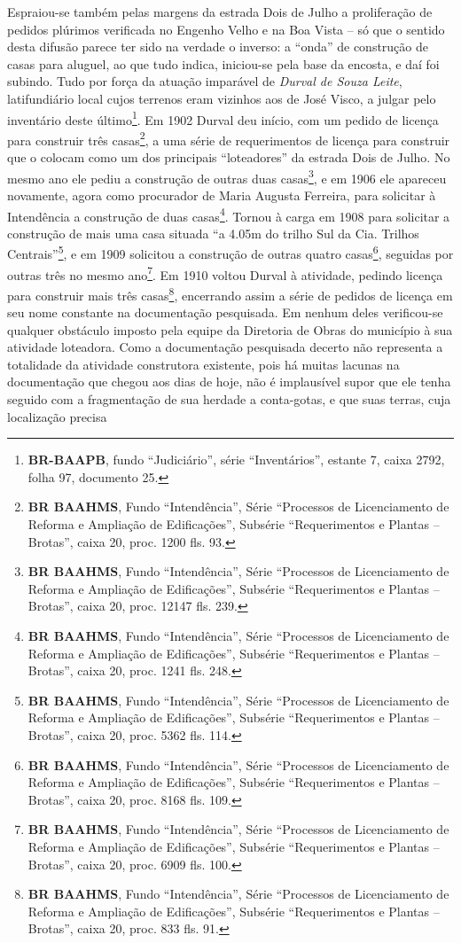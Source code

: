Espraiou-se também pelas margens da estrada Dois de Julho a proliferação de pedidos plúrimos verificada no Engenho Velho e na Boa Vista -- só que o sentido desta difusão parece ter sido na verdade o inverso: a ``onda'' de construção de casas para aluguel, ao que tudo indica, iniciou-se pela base da encosta, e daí foi subindo. Tudo por força da atuação imparável de \textit{Durval de Souza Leite}, latifundiário local cujos terrenos eram vizinhos aos de José Visco, a julgar pelo inventário deste último\footnote{\textbf{BR-BAAPB}, fundo ``Judiciário'', série ``Inventários'', estante 7, caixa 2792, folha 97, documento 25.}. Em 1902 Durval deu início, com um pedido de licença para construir três casas\footnote{\textbf{BR BAAHMS}, Fundo ``Intendência'', Série ``Processos de Licenciamento de Reforma e Ampliação de Edificações'', Subsérie ``Requerimentos e Plantas -- Brotas'', caixa 20, proc. 1200 fls. 93.}, a uma série de requerimentos de licença para construir que o colocam como um dos principais ``loteadores'' da estrada Dois de Julho. No mesmo ano ele pediu a construção de outras duas casas\footnote{\textbf{BR BAAHMS}, Fundo ``Intendência'', Série ``Processos de Licenciamento de Reforma e Ampliação de Edificações'', Subsérie ``Requerimentos e Plantas -- Brotas'', caixa 20, proc. 12147 fls. 239.}, e em 1906 ele apareceu novamente, agora como procurador de Maria Augusta Ferreira, para solicitar à Intendência a construção de duas casas\footnote{\textbf{BR BAAHMS}, Fundo ``Intendência'', Série ``Processos de Licenciamento de Reforma e Ampliação de Edificações'', Subsérie ``Requerimentos e Plantas -- Brotas'', caixa 20, proc. 1241 fls. 248.}. Tornou à carga em 1908 para solicitar a construção de mais uma casa situada ``a 4.05m do trilho Sul da Cia. Trilhos Centrais''\footnote{\textbf{BR BAAHMS}, Fundo ``Intendência'', Série ``Processos de Licenciamento de Reforma e Ampliação de Edificações'', Subsérie ``Requerimentos e Plantas -- Brotas'', caixa 20, proc. 5362 fls. 114.}, e em 1909 solicitou a construção de outras quatro casas\footnote{\textbf{BR BAAHMS}, Fundo ``Intendência'', Série ``Processos de Licenciamento de Reforma e Ampliação de Edificações'', Subsérie ``Requerimentos e Plantas -- Brotas'', caixa 20, proc. 8168 fls. 109.}, seguidas por outras três no mesmo ano\footnote{\textbf{BR BAAHMS}, Fundo ``Intendência'', Série ``Processos de Licenciamento de Reforma e Ampliação de Edificações'', Subsérie ``Requerimentos e Plantas -- Brotas'', caixa 20, proc. 6909 fls. 100.}. Em 1910 voltou Durval à atividade, pedindo licença para construir mais três casas\footnote{\textbf{BR BAAHMS}, Fundo ``Intendência'', Série ``Processos de Licenciamento de Reforma e Ampliação de Edificações'', Subsérie ``Requerimentos e Plantas -- Brotas'', caixa 20, proc. 833 fls. 91.}, encerrando assim a série de pedidos de licença em seu nome constante na documentação pesquisada. Em nenhum deles verificou-se qualquer obstáculo imposto pela equipe da Diretoria de Obras do município à sua atividade loteadora. Como a documentação pesquisada decerto não representa a totalidade da atividade construtora existente, pois há muitas lacunas na documentação que chegou aos dias de hoje, não é implausível supor que ele tenha seguido com a fragmentação de sua herdade a conta-gotas, e que suas terras, cuja localização precisa 